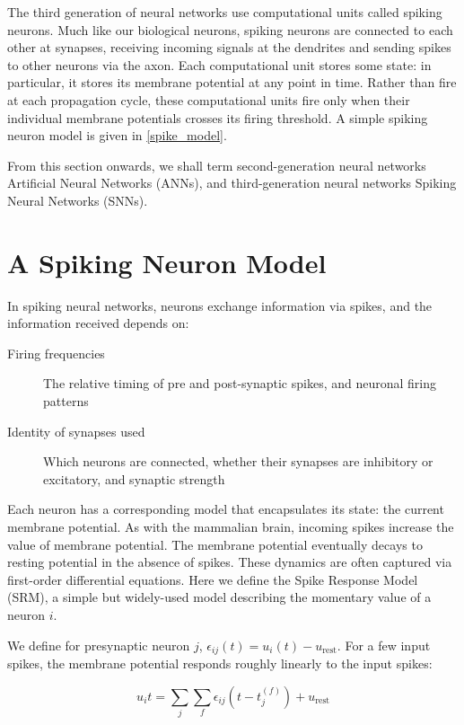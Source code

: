 \documentclass[fyp]{socreport}
\begin{document}
The third generation of neural networks use computational units called spiking
neurons. Much like our biological neurons, spiking neurons are connected to each
other at synapses, receiving incoming signals at the dendrites and sending
spikes to other neurons via the axon. Each computational unit stores some state:
in particular, it stores its membrane potential at any point in time. Rather
than fire at each propagation cycle, these computational units fire only when
their individual membrane potentials crosses its firing threshold. A simple
spiking neuron model is given in \autoref{spike_model}.

From this section onwards, we shall term second-generation neural networks
Artificial Neural Networks (ANNs), and third-generation neural networks Spiking
Neural Networks (SNNs).

\section{A Spiking Neuron Model\label{sec:spiking-neuron-model}}

In spiking neural networks, neurons exchange information via spikes, and the
information received depends on:

\begin{description}
\item[{Firing frequencies}] The relative timing of pre and post-synaptic spikes,
and neuronal firing patterns
\item[{Identity of synapses used}] Which neurons are connected, whether their
synapses are inhibitory or excitatory, and synaptic strength
\end{description}

Each neuron has a corresponding model that encapsulates its state: the current
membrane potential. As with the mammalian brain, incoming spikes increase the
value of membrane potential. The membrane potential eventually decays to resting
potential in the absence of spikes. These dynamics are often captured via
first-order differential equations. Here we define the Spike Response Model
(SRM), a simple but widely-used model describing the momentary value of a neuron
\(i\).

We define for presynaptic neuron \(j\),
\(\epsilon_{ij}(t) = u_{i}(t) - u_{\text{rest}}\). For a few input spikes, the
membrane potential responds roughly linearly to the input spikes:

\begin{equation} u_i{t} = \sum_{j}\sum_{f} \epsilon_{ij}(t - t_j^{(f)}) + u_{\text{rest}}
\end{equation}
\end{document}
